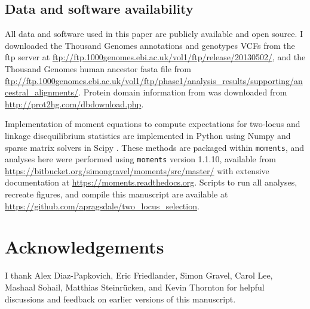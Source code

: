 \documentclass[]{article}
\begin{document}
\subsection{Data and software availability}
\label{data-and-software-availability}

All data and software used in this paper are publicly available and open
source. I downloaded the Thousand Genomes annotations and genotypes VCFs from
the ftp server at
\url{ftp://ftp.1000genomes.ebi.ac.uk/vol1/ftp/release/20130502/}, and the
Thousand Genomes human ancestor fasta file from
\url{ftp://ftp.1000genomes.ebi.ac.uk/vol1/ftp/phase1/analysis_results/supporting/ancestral_alignments/}.
Protein domain information from \citet{Stanek2020-pa} was downloaded from
\url{http://prot2hg.com/dbdownload.php}.

Implementation of moment equations to compute expectations for two-locus and
linkage disequilibrium statistics are implemented in Python using Numpy
\citep{Harris2020-pc} and sparse matrix solvers in Scipy
\citep{Virtanen2020-kr}. These methods are packaged within \texttt{moments},
and analyses here were performed using \texttt{moments} version 1.1.10,
available from \url{https://bitbucket.org/simongravel/moments/src/master/} with
extensive documentation at \url{https://moments.readthedocs.org}. Scripts to
run all analyses, recreate figures, and compile this manuscript are available
at \url{https://github.com/apragsdale/two_locus_selection}.

\section{Acknowledgements}\label{acknowledgements}

I thank Alex Diaz-Papkovich, Eric Friedlander, Simon Gravel, Carol Lee, Mashaal
Sohail, Matthias Steinrücken, and Kevin Thornton for helpful discussions and
feedback on earlier versions of this manuscript.

  

\end{document}
